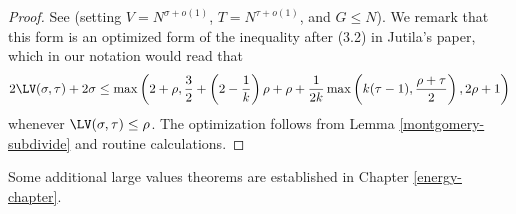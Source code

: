 \literature
{}

\begin{proof} See \cite[(1.4)]{jutila_zero_density_1977} (setting $V = N^{\sigma+o(1)}$, $T = N^{\tau+o(1)}$, and $G \leq N$).  We remark that this form is an optimized form of the inequality after (3.2) in Jutila's paper, which in our notation would read that
$$ 2\LV(\sigma,\tau) + 2\sigma \leq \max \left(2 + \rho, \frac{3}{2} + \left(2 - \frac{1}{k}\right)\rho + \rho + \frac{1}{2k}\max\left(k(\tau-1), \frac{\rho+\tau}{2}\right), 2\rho + 1\right)$$
whenever $\LV(\sigma,\tau) \leq \rho$.  The optimization follows from Lemma \ref{montgomery-subdivide} and routine calculations.
\end{proof}

Some additional large values theorems are established in Chapter \ref{energy-chapter}.
